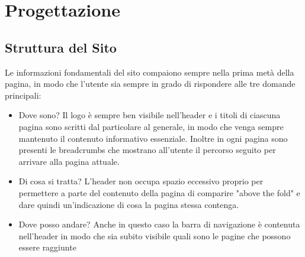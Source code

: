 \section{Progettazione}
    \subsection{Struttura del Sito}
		Le informazioni fondamentali del sito compaiono sempre nella prima metà della pagina, in modo che l'utente sia sempre in grado di rispondere alle tre domande principali:
		\begin{itemize}
			\item Dove sono? Il logo è sempre ben visibile nell'header e i titoli di ciascuna pagina sono scritti dal particolare al generale, in modo che venga sempre mantenuto il contenuto informativo essenziale. Inoltre in ogni pagina sono presenti le breadcrumbs che mostrano all'utente il percorso seguito per arrivare alla pagina attuale.
			\item Di cosa si tratta? L'header non occupa spazio eccessivo proprio per permettere a parte del contenuto della pagina di comparire "above the fold" e dare quindi un'indicazione di cosa la pagina stessa contenga.
			\item Dove posso andare? Anche in questo caso la barra di navigazione è contenuta nell'header in modo che sia subito visibile quali sono le pagine che possono essere raggiunte
		\end{itemize}

